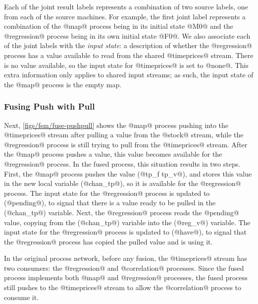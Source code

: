 Each of the joint result labels represents a combination of two source labels, one from each of the source machines.
For example, the first joint label  represents a combination of the @map@ process being in its initial state @M0@ and the @regression@ process being in its own initial state @F0@. 
We also associate each of the joint labels with the \emph{input state}: a description of whether the @regression@ process has a value available to read from the shared @timeprices@ stream.
There is no value available, so the input state for @timeprices@ is set to @none@.
This extra information only applies to shared input streams; as such, the input state of the @map@ process is the empty map.

\subsubsection{Fusing Push with Pull}
\label{s:Fusion:FusingPushPull}

Next, \cref{figs/fsm/fuse-pushpull} shows the @map@ process pushing into the @timeprices@ stream after pulling a value from the @stock@ stream, while the @regression@ process is still trying to pull from the @timeprices@ stream.
After the @map@ process pushes a value, this value becomes available for the @regression@ process.
In the fused process, this situation results in two steps.
First, the @map@ process pushes the value (@tp_f tp_v@), and stores this value in the new local variable (@chan_tp@), so it is available for the @regression@ process.
The input state for the @regression@ process is updated to (@pending@), to signal that there is a value ready to be pulled in the (@chan_tp@) variable.
Next, the @regression@ process reads the @pending@ value, copying from the (@chan_tp@) variable into the (@reg_v@) variable.
The input state for the @regression@ process is updated to (@have@), to signal that the @regression@ process has copied the pulled value and is using it.

In the original process network, before any fusion, the @timeprices@ stream has two consumers: the @regression@ and @correlation@ processes.
Since the fused process implements both @map@ and @regression@ processes, the fused process still pushes to the @timeprices@ stream to allow the @correlation@ process to consume it.

